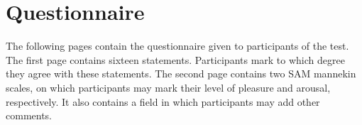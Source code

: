 \chapter{Questionnaire}\label{app:questionnaire}
The following pages contain the questionnaire given to participants of the test. The first page contains sixteen statements. Participants mark to which degree they agree with these statements. The second page contains two SAM mannekin scales, on which participants may mark their level of pleasure and arousal, respectively. It also contains a field in which participants may add other comments.



